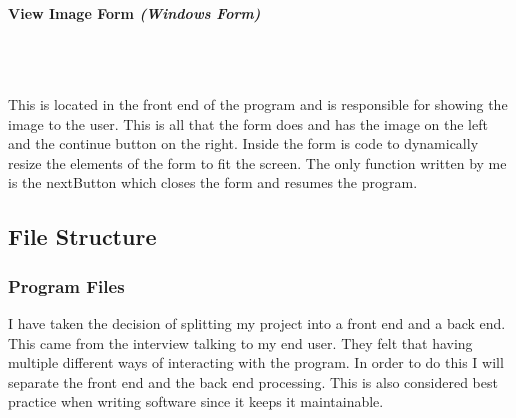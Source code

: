 \begin{FlushLeft}
    \bk

    \pagebreak
\paragraph{View Image Form \textit{(Windows Form)}} \mbox{} \\

    \begin{figure}[H]
        \centering
    \end{figure}\\

    This is located in the front end of the program and is responsible for showing the image to the user. This is all that the form does and has the image on the left and the continue button on the right. Inside the form is code to dynamically resize the elements of the form to fit the screen. The only function written by me is the nextButton which closes the form and resumes the program.

    \BK

    \subsection{File Structure}
    \subsubsection{Program Files}
    I have taken the decision of splitting my project into a front end and a back end. This came from the interview talking to my end user. They felt that having multiple different ways of interacting with the program. In order to do this I will separate the front end and the back end processing. This is also considered best practice when writing software since it keeps it maintainable. \\ \bk
    

\end{FlushLeft}
